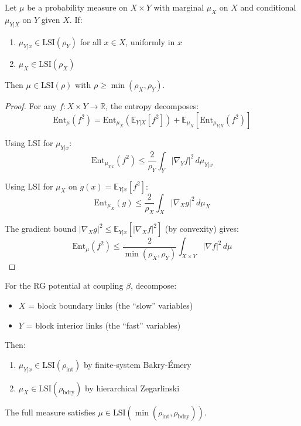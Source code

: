 \begin{theorem}
\label{thm:conditional-tensorization-app76}
Let $\mu$ be a probability measure on $X \times Y$ with marginal $\mu_X$ on $X$ 
and conditional $\mu_{Y|X}$ on $Y$ given $X$. If:
\begin{enumerate}
\item $\mu_{Y|x} \in \mathrm{LSI}(\rho_Y)$ for all $x \in X$, uniformly in $x$
\item $\mu_X \in \mathrm{LSI}(\rho_X)$
\end{enumerate}
Then $\mu \in \mathrm{LSI}(\rho)$ with $\rho \geq \min(\rho_X, \rho_Y)$.
\end{theorem}

\begin{proof}
For any $f: X \times Y \to \mathbb{R}$, the entropy decomposes:
\[
\mathrm{Ent}_\mu(f^2) = \mathrm{Ent}_{\mu_X}(\mathbb{E}_{Y|X}[f^2]) + \mathbb{E}_{\mu_X}[\mathrm{Ent}_{\mu_{Y|X}}(f^2)]
\]

Using LSI for $\mu_{Y|x}$:
\[
\mathrm{Ent}_{\mu_{Y|x}}(f^2) \leq \frac{2}{\rho_Y} \int_Y |\nabla_Y f|^2 \, d\mu_{Y|x}
\]

Using LSI for $\mu_X$ on $g(x) = \mathbb{E}_{Y|x}[f^2]$:
\[
\mathrm{Ent}_{\mu_X}(g) \leq \frac{2}{\rho_X} \int_X |\nabla_X g|^2 \, d\mu_X
\]

The gradient bound $|\nabla_X g|^2 \leq \mathbb{E}_{Y|x}[|\nabla_X f|^2]$ (by convexity) gives:
\[
\mathrm{Ent}_\mu(f^2) \leq \frac{2}{\min(\rho_X, \rho_Y)} \int_{X \times Y} |\nabla f|^2 \, d\mu
\]
\end{proof}

\begin{corollary}
\label{cor:rg-blocking-lsi}
For the RG potential at coupling $\beta$, decompose:
\begin{itemize}
\item $X$ = block boundary links (the ``slow'' variables)
\item $Y$ = block interior links (the ``fast'' variables)
\end{itemize}

Then:
\begin{enumerate}
\item $\mu_{Y|x} \in \mathrm{LSI}(\rho_{\text{int}})$ by finite-system Bakry-\'Emery
\item $\mu_X \in \mathrm{LSI}(\rho_{\text{bdry}})$ by hierarchical Zegarlinski
\end{enumerate}

The full measure satisfies $\mu \in \mathrm{LSI}(\min(\rho_{\text{int}}, \rho_{\text{bdry}}))$.
\end{corollary}

